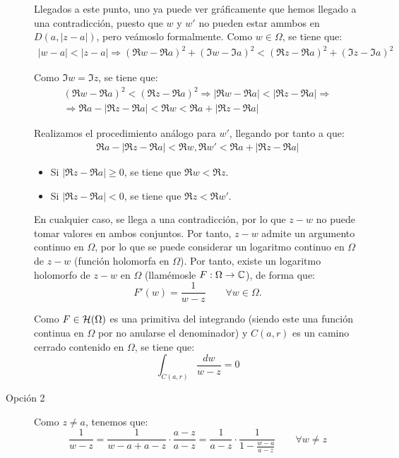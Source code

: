\begin{ejercicio}
\begin{description}
        Llegados a este punto, uno ya puede ver gráficamente que hemos llegado a una contradicción, puesto que $w$ y $w'$ no pueden estar ammbos en $D(a,|z-a|)$, pero veámoslo formalmente.
        Como $w\in \Omega$, se tiene que:
        \begin{align*}
            |w-a| < |z-a|\Longrightarrow \left(\Re w-\Re a\right)^2+\left(\Im w-\Im a\right)^2 < \left(\Re z-\Re a\right)^2+\left(\Im z-\Im a\right)^2
        \end{align*}

        Como $\Im w=\Im z$, se tiene que:
        \begin{multline*}
            \left(\Re w-\Re a\right)^2<\left(\Re z-\Re a\right)^2
            \Longrightarrow |\Re w-\Re a|<|\Re z-\Re a|\Longrightarrow \\ \Longrightarrow
            \Re a - |\Re z -\Re a| < \Re w < \Re a + |\Re z - \Re a|
        \end{multline*}

        Realizamos el procedimiento análogo para $w'$, llegando por tanto a que:
        \begin{align*}
            \Re a - |\Re z -\Re a| < \Re w,\Re w' < \Re a + |\Re z - \Re a|
        \end{align*}
        \begin{itemize}
            \item Si $|\Re z -\Re a| \geq 0$, se tiene que $\Re w<\Re z$.
            \item Si $|\Re z -\Re a| < 0$, se tiene que $\Re z<\Re w'$.
        \end{itemize}

        En cualquier caso, se llega a una contradicción, por lo que $z-w$ no puede tomar valores en ambos conjuntos. Por tanto, $z-w$ admite un argumento continuo en $\Omega$, por lo que se puede considerar un logaritmo continuo en $\Omega$ de $z-w$ (función holomorfa en $\Omega$). Por tanto, existe un logaritmo holomorfo de $z-w$ en $\Omega$ (llamémosle $F:\Omega \to \mathbb{C}$), de forma que:
        \begin{equation*}
            F'(w) = \frac{1}{w-z} \qquad \forall w \in \Omega.
        \end{equation*}

        Como $F\in \mathcal{H}(\Omega)$ es una primitiva del integrando (siendo este una función continua en $\Omega$ por no anularse el denominador) y $C(a,r)$ es un camino cerrado contenido en $\Omega$, se tiene que:
        \begin{equation*}
            \int_{C(a,r)} \frac{dw}{w-z} = 0
        \end{equation*}

        \item[Opción 2] Como $z\neq a$, tenemos que:
        \begin{equation*}
            \dfrac{1}{w-z} = \dfrac{1}{w-a+a-z}\cdot \dfrac{a-z}{a-z}
            = \dfrac{1}{a-z}\cdot \dfrac{1}{1-\frac{w-a}{a-z}}\qquad \forall w\neq z
        \end{equation*}

    \end{description}
\end{ejercicio}

